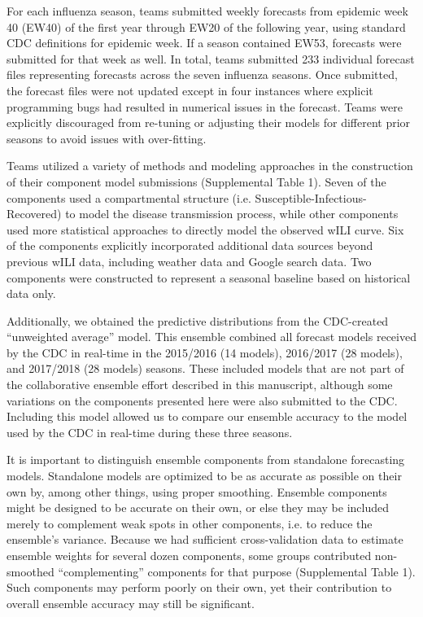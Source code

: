 \documentclass{article}\usepackage[]{graphicx}\usepackage[]{color}
\begin{document}
For each influenza season, teams submitted weekly forecasts from epidemic week 40 (EW40) of the first year through EW20 of the following year, using standard CDC definitions for epidemic week.\cite{NewMexicoDepartmentofHealth,Niemi2015,Tushar2018} If a season contained EW53, forecasts were submitted for that week as well. In total, teams submitted 233 individual forecast files representing forecasts across the seven influenza seasons. Once submitted, the forecast files were not updated except in four instances where explicit programming bugs had resulted in numerical issues in the forecast. Teams were explicitly discouraged from re-tuning or adjusting their models for different prior seasons to avoid issues with over-fitting.

Teams utilized a variety of methods and modeling approaches in the construction of their component model submissions (Supplemental Table 1). Seven of the components used a compartmental structure (i.e. Susceptible-Infectious-Recovered) to model the disease transmission process, while other components used more statistical approaches to directly model the observed wILI curve. Six of the components explicitly incorporated additional data sources beyond previous wILI data, including weather data and Google search data. Two components were constructed to represent a seasonal baseline based on historical data only.

Additionally, we obtained the predictive distributions from the CDC-created ``unweighted average'' model. This ensemble combined all forecast models received by the CDC in real-time in the 2015/2016 (14 models), 2016/2017 (28 models), and 2017/2018 (28 models) seasons.\cite{McGowan2018} These included models that are not part of the collaborative ensemble effort described in this manuscript, although some variations on the components presented here were also submitted to the CDC. Including this model allowed us to compare our ensemble accuracy to the model used by the CDC in real-time during these three seasons.

It is important to distinguish ensemble components from standalone forecasting models.  
Standalone models are optimized to be as accurate as possible on their own by, among other things, using proper smoothing.
Ensemble components might be designed to be accurate on their own, or else they may be included merely to complement weak spots in other components, i.e. to reduce the ensemble's variance.  
Because we had sufficient cross-validation data to estimate ensemble weights for several dozen components, some groups contributed non-smoothed ``complementing'' components for that purpose (Supplemental Table 1).  
Such components may perform poorly on their own, yet their contribution to overall ensemble accuracy may still be significant.
\end{document}
